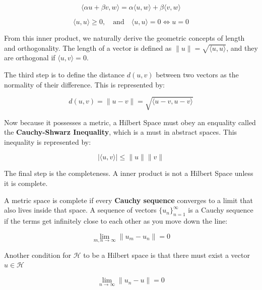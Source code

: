 \documentclass[12pt]{article}
\begin{document}
\begin{equation*}
\langle \alpha u+\beta v,w\rangle =\alpha \langle u,w\rangle +\beta \langle v,w\rangle
\end{equation*}

\begin{equation*}
\langle u,u\rangle \ge 0,\quad \text{and}\quad \langle u,u\rangle =0\iff u=0
\end{equation*}

From this inner product, we naturally derive the geometric concepts of length and orthogonality. The length of a vector is defined as $\|u\| = \sqrt{\langle u, u \rangle}$, and they are orthogonal if $\langle u,v \rangle = 0$.

The third step is to define the distance $d(u,v)$ between two vectors as the normality of their difference. This is represented by:

\begin{equation}
d(u,v)=\|u-v\|=\sqrt{\langle u-v,u-v\rangle } \tag{8}
\end{equation}
\vspace{0.1cm}

Now because it possesses a metric, a Hilbert Space must obey an enquality called the \textbf{Cauchy-Shwarz Inequality}, which is a must in abstract spaces. This inequality is represented by:

\begin{equation}
|\langle u,v\rangle | \le \|u\|\|v\| \tag{9}
\end{equation}
\vspace{0.1cm}

The final step is the completeness. A inner product is not a Hilbert Space unless it is complete. 

A metric space is complete if every \textbf{Cauchy sequence} converges to a limit that also lives inside that space. A sequence of vectors $\{u_n\}_{n=1}^{\infty}$ is a Cauchy sequence if the terms get infinitely close to each other as you move down the line:

\begin{equation}
\lim _{m,n\rightarrow \infty }\|u_{m}-u_{n}\|=0 \tag{10}
\end{equation}
\vspace{0.1cm}

Another condition for $\mathcal{H}$ to be a Hilbert space is that there must exist a vector $u \in \mathcal{H}$ 

\begin{equation}
\lim _{n\rightarrow \infty }\|u_{n}-u\|=0 \tag{11}
\end{equation}
\vspace{0.1cm}
\end{document}
